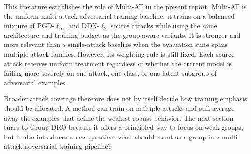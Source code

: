 This literature establishes the role of Multi-AT in the present report. Multi-AT
is the uniform multi-attack adversarial training baseline: it trains on a
balanced mixture of PGD-\(\ell_\infty\) and DDN-\(\ell_2\) source attacks while
using the same architecture and training budget as the group-aware variants.
It is stronger and more relevant than a single-attack baseline when the
evaluation suite spans multiple attack families. However, its weighting rule is
still fixed. Each source attack receives uniform treatment regardless of
whether the current model is failing more severely on one attack, one class, or
one latent subgroup of adversarial examples.

Broader attack coverage therefore does not by itself decide how training
emphasis should be allocated. A method can train on multiple attacks and still
average away the examples that define the weakest robust behavior. The next
section turns to Group DRO because it offers a principled way to focus on weak
groups, but it also introduces a new question: what should count as a group in
a multi-attack adversarial training pipeline?
